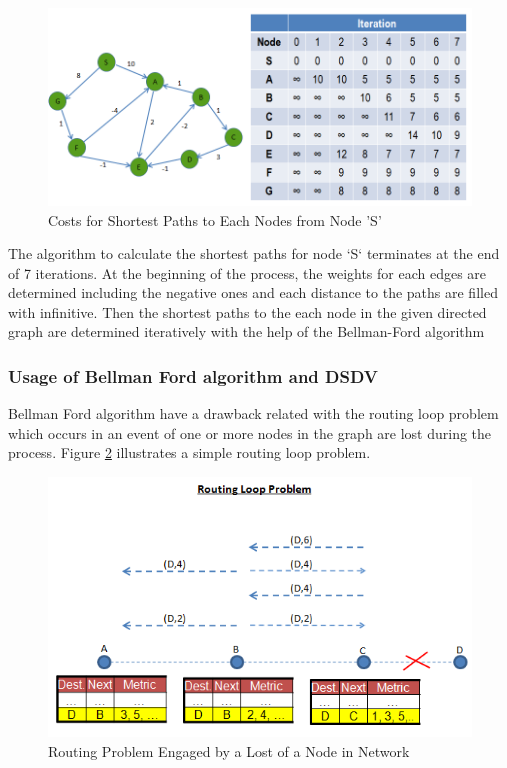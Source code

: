 \begin{figure}[H]
\caption{Costs for Shortest Paths to Each Nodes from Node 'S'} \label{bellman_ref}
\centering
\includegraphics[scale = 0.60]{bellman}
\end{figure}

The algorithm to calculate the shortest paths for node `S` terminates at the end of 7 iterations. At the beginning of the process, the weights for each edges are determined including the negative ones and each distance to the paths are filled with infinitive. Then the shortest paths to the each node in the given directed graph are determined iteratively with the help of the Bellman-Ford algorithm

\subsubsection{Usage of Bellman Ford algorithm and DSDV}
Bellman Ford algorithm have a drawback related with the routing loop problem which occurs in an event of one or more nodes in the graph are lost during the process. Figure \ref{routing_problem2} illustrates a simple routing loop problem.

\begin{figure}[H] 
\caption{Routing Problem Engaged by a Lost of a Node in Network} \label{routing_problem2}
\centering
\includegraphics[scale = 0.65]{routing_problem}
\end{figure}

